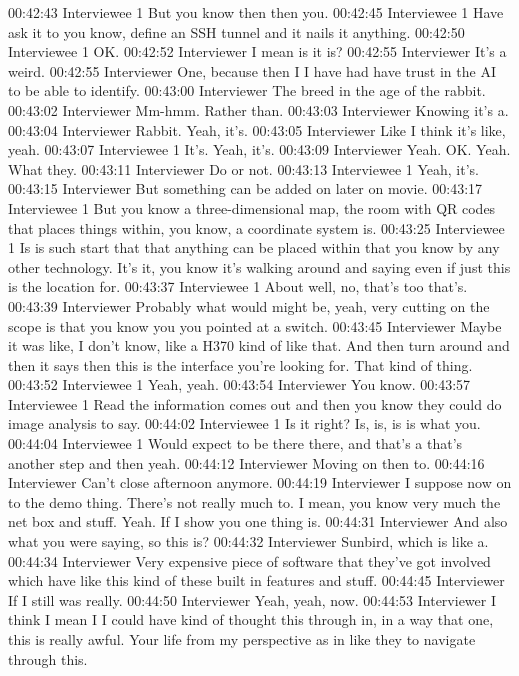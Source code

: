 00:42:43 Interviewee 1
But you know then then you.
00:42:45 Interviewee 1
Have ask it to you know, define an SSH tunnel and it nails it anything.
00:42:50 Interviewee 1
OK.
00:42:52 Interviewer
I mean is it is?
00:42:55 Interviewer
It's a weird.
00:42:55 Interviewer
One, because then I I have had have trust in the AI to be able to identify.
00:43:00 Interviewer
The breed in the age of the rabbit.
00:43:02 Interviewer
Mm-hmm. Rather than.
00:43:03 Interviewer
Knowing it's a.
00:43:04 Interviewer
Rabbit. Yeah, it's.
00:43:05 Interviewer
Like I think it's like, yeah.
00:43:07 Interviewee 1
It's. Yeah, it's.
00:43:09 Interviewer
Yeah. OK. Yeah. What they.
00:43:11 Interviewer
Do or not.
00:43:13 Interviewee 1
Yeah, it's.
00:43:15 Interviewer
But something can be added on later on movie.
00:43:17 Interviewee 1
But you know a three-dimensional map, the room with QR codes that places things within, you know, a coordinate system is.
00:43:25 Interviewee 1
Is is such start that that anything can be placed within that you know by any other technology. It's it, you know it's walking around and saying even if just this is the location for.
00:43:37 Interviewee 1
About well, no, that's too that's.
00:43:39 Interviewer
Probably what would might be, yeah, very cutting on the scope is that you know you you pointed at a switch.
00:43:45 Interviewer
Maybe it was like, I don't know, like a H370 kind of like that. And then turn around and then it says then this is the interface you're looking for. That kind of thing.
00:43:52 Interviewee 1
Yeah, yeah.
00:43:54 Interviewer
You know.
00:43:57 Interviewee 1
Read the information comes out and then you know they could do image analysis to say.
00:44:02 Interviewee 1
Is it right? Is, is, is is what you.
00:44:04 Interviewee 1
Would expect to be there there, and that's a that's another step and then yeah.
00:44:12 Interviewer
Moving on then to.
00:44:16 Interviewer
Can't close afternoon anymore.
00:44:19 Interviewer
I suppose now on to the demo thing. There's not really much to. I mean, you know very much the net box and stuff. Yeah. If I show you one thing is.
00:44:31 Interviewer
And also what you were saying, so this is?
00:44:32 Interviewer
Sunbird, which is like a.
00:44:34 Interviewer
Very expensive piece of software that they've got involved which have like this kind of these built in features and stuff.
00:44:45 Interviewer
If I still was really.
00:44:50 Interviewer
Yeah, yeah, now.
00:44:53 Interviewer
I think I mean I I could have kind of thought this through in, in a way that one, this is really awful. Your life from my perspective as in like they to navigate through this.
